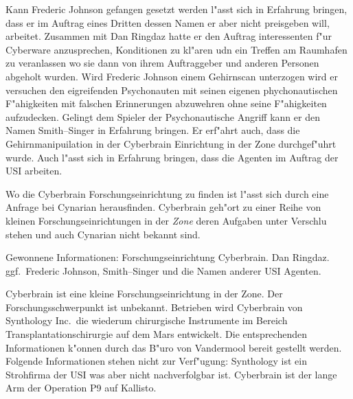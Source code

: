 Kann Frederic Johnson gefangen gesetzt werden l"asst sich in Erfahrung bringen, dass er im Auftrag eines Dritten dessen Namen er aber nicht preisgeben will, arbeitet. Zusammen mit Dan Ringdaz hatte er den Auftrag interessenten f"ur Cyberware anzusprechen, Konditionen zu kl"aren udn ein Treffen am Raumhafen zu veranlassen wo sie dann von ihrem Auftraggeber und anderen Personen abgeholt wurden. Wird Frederic Johnson einem Gehirnscan unterzogen wird er versuchen den eigreifenden Psychonauten mit seinen eigenen phychonautischen F"ahigkeiten mit falschen Erinnerungen abzuwehren ohne seine F"ahigkeiten aufzudecken. Gelingt dem Spieler der Psychonautische Angriff kann er den Namen Smith--Singer in Erfahrung bringen. Er erf"ahrt auch, dass die Gehirnmanipuilation in der Cyberbrain Einrichtung in der Zone durchgef"uhrt wurde. Auch l"asst sich in Erfahrung bringen, dass die Agenten im Auftrag der USI arbeiten.

Wo die Cyberbrain Forschungseinrichtung zu finden ist l"asst sich durch eine Anfrage bei Cynarian herausfinden. Cyberbrain geh"ort zu einer Reihe von kleinen Forschungseinrichtungen in der \emph{Zone} deren Aufgaben unter Verschlu\3 stehen und auch Cynarian nicht bekannt sind.

\begin{remarks}
	Gewonnene Informationen: Forschungseinrichtung Cyberbrain. Dan Ringdaz. ggf.~Frederic Johnson, Smith--Singer und die Namen anderer USI Agenten.
\end{remarks}

\newcommand{\ml}{\pinyin{Mailin2}}

Cyberbrain ist eine kleine Forschungseinrichtung in der Zone. Der Forschungsschwerpunkt ist unbekannt. Betrieben wird Cyberbrain von Synthology Inc.~die wiederum chirurgische Instrumente im Bereich Transplantationschirurgie auf dem Mars entwickelt. Die entsprechenden Informationen k"onnen durch das B"uro von Vandermool bereit gestellt werden. Folgende Informationen stehen nicht zur Verf"ugung: Synthology ist ein Strohfirma der USI was aber nicht nachverfolgbar ist. Cyberbrain ist der lange Arm der Operation P9 auf Kallisto.

